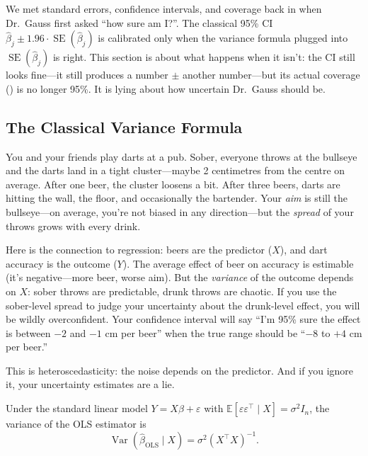 \documentclass[11pt,a4paper]{article}
\theoremstyle{definition}
\theoremstyle{plain}
\theoremstyle{remark}
\newcommand{\E}{\mathbb{E}}
\newcommand{\Var}{\operatorname{Var}}
\newcommand{\se}{\operatorname{SE}}
\newcommand{\bhat}{\hat{\beta}}
\newcommand{\bols}{\hat{\beta}_{\text{OLS}}}
\begin{document}
We met standard errors, confidence intervals, and coverage back in  when Dr.\ Gauss first asked ``how sure am I?''. The classical 95\% CI $\bhat_j \pm 1.96 \cdot \se(\bhat_j)$ is calibrated only when the variance formula plugged into $\se(\bhat_j)$ is right. This section is about what happens when it isn't: the CI still looks fine---it still produces a number $\pm$ another number---but its actual coverage () is no longer 95\%. It is lying about how uncertain Dr.\ Gauss should be.

\subsection{The Classical Variance Formula}

\begin{toystory}[title={Drunk Darts}]
You and your friends play darts at a pub. Sober, everyone throws at the bullseye and the darts land in a tight cluster---maybe 2 centimetres from the centre on average. After one beer, the cluster loosens a bit. After three beers, darts are hitting the wall, the floor, and occasionally the bartender. Your \emph{aim} is still the bullseye---on average, you're not biased in any direction---but the \emph{spread} of your throws grows with every drink.

Here is the connection to regression: beers are the predictor ($X$), and dart accuracy is the outcome ($Y$). The average effect of beer on accuracy is estimable (it's negative---more beer, worse aim). But the \emph{variance} of the outcome depends on $X$: sober throws are predictable, drunk throws are chaotic. If you use the sober-level spread to judge your uncertainty about the drunk-level effect, you will be wildly overconfident. Your confidence interval will say ``I'm 95\% sure the effect is between $-2$ and $-1$ cm per beer'' when the true range should be ``$-8$ to $+4$ cm per beer.''

This is heteroscedasticity: the noise depends on the predictor. And if you ignore it, your uncertainty estimates are a lie.
\end{toystory}

Under the standard linear model $Y = X\beta + \varepsilon$ with $\E[\varepsilon\varepsilon^\top \mid X] = \sigma^2 I_n$, the variance of the OLS estimator is
\begin{equation}\label{eq:var-homo}
  \Var(\bols \mid X) = \sigma^2 (X^\top X)^{-1}.
\end{equation}
\end{document}
